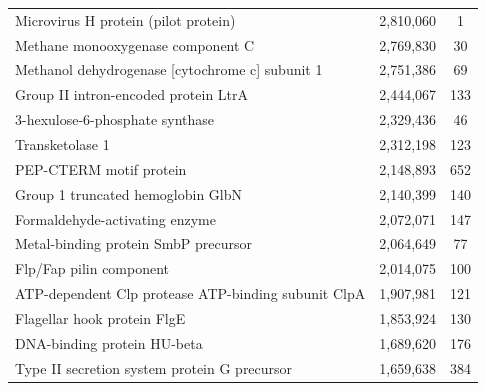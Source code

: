 \begin{singlespace}
\begin{longtable}{p{} cc}
                                                      Microvirus H protein (pilot protein) &                   2,810,060 &             1 \\
                                                         Methane monooxygenase component C &                   2,769,830 &            30 \\
                                           Methanol dehydrogenase [cytochrome c] subunit 1 &                   2,751,386 &            69 \\
                                                      Group II intron-encoded protein LtrA &                   2,444,067 &           133 \\
                                                           3-hexulose-6-phosphate synthase &                   2,329,436 &            46 \\
                                                                           Transketolase 1 &                   2,312,198 &           123 \\
                                                                   PEP-CTERM motif protein &                   2,148,893 &           652 \\
                                                         Group 1 truncated hemoglobin GlbN &                   2,140,399 &           140 \\
                                                            Formaldehyde-activating enzyme &                   2,072,071 &           147 \\
                                                      Metal-binding protein SmbP precursor &                   2,064,649 &            77 \\
                                                                   Flp/Fap pilin component &                   2,014,075 &           100 \\
                                       ATP-dependent Clp protease ATP-binding subunit ClpA &                   1,907,981 &           121 \\
                                                               Flagellar hook protein FlgE &                   1,853,924 &           130 \\
                                                               DNA-binding protein HU-beta &                   1,689,620 &           176 \\
                                              Type II secretion system protein G precursor &                   1,659,638 &           384 \\

\end{longtable}
\end{singlespace}
